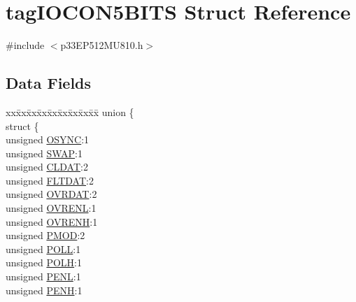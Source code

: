 \hypertarget{structtag_i_o_c_o_n5_b_i_t_s}{}\section{tag\+I\+O\+C\+O\+N5\+B\+I\+TS Struct Reference}
\label{structtag_i_o_c_o_n5_b_i_t_s}


{\ttfamily \#include $<$p33\+E\+P512\+M\+U810.\+h$>$}

\subsection*{Data Fields}
\begin{DoxyCompactItemize}
\item 
\begin{tabbing}
xx\=xx\=xx\=xx\=xx\=xx\=xx\=xx\=xx\=\kill
union \{\\
\>struct \{\\
\>\>unsigned \hyperlink{structtag_i_o_c_o_n5_b_i_t_s_aee7f35d5d04fcd5202b9d569e0d08146}{OSYNC}:1\\
\>\>unsigned \hyperlink{structtag_i_o_c_o_n5_b_i_t_s_a3ed0654ceb192d32e26d2929c9b8dcc2}{SWAP}:1\\
\>\>unsigned \hyperlink{structtag_i_o_c_o_n5_b_i_t_s_a5bcbfaa85bc9c3349fb4e269aa308899}{CLDAT}:2\\
\>\>unsigned \hyperlink{structtag_i_o_c_o_n5_b_i_t_s_afcc1e84f8b5860ae56a567b5de96af73}{FLTDAT}:2\\
\>\>unsigned \hyperlink{structtag_i_o_c_o_n5_b_i_t_s_a6d82e38a9acf634763a64a6876f58d3d}{OVRDAT}:2\\
\>\>unsigned \hyperlink{structtag_i_o_c_o_n5_b_i_t_s_a2e98ef1aea75144311343faf9f705f2d}{OVRENL}:1\\
\>\>unsigned \hyperlink{structtag_i_o_c_o_n5_b_i_t_s_a0e87b6433e91b1b0d550e9419e22b408}{OVRENH}:1\\
\>\>unsigned \hyperlink{structtag_i_o_c_o_n5_b_i_t_s_a4a7369a55430f3368fb601d87d479553}{PMOD}:2\\
\>\>unsigned \hyperlink{structtag_i_o_c_o_n5_b_i_t_s_a269dd0694f25a7b4dd065f3570e09b5e}{POLL}:1\\
\>\>unsigned \hyperlink{structtag_i_o_c_o_n5_b_i_t_s_a21a3881dcaa3ce8bccd5d9906aee8e55}{POLH}:1\\
\>\>unsigned \hyperlink{structtag_i_o_c_o_n5_b_i_t_s_af777eadaa0b86bb09cad6117a36e15aa}{PENL}:1\\
\>\>unsigned \hyperlink{structtag_i_o_c_o_n5_b_i_t_s_a91f04ec56f33e5a2e402f3817a44e91d}{PENH}:1\\

\end{tabbing}
\end{DoxyCompactItemize}
